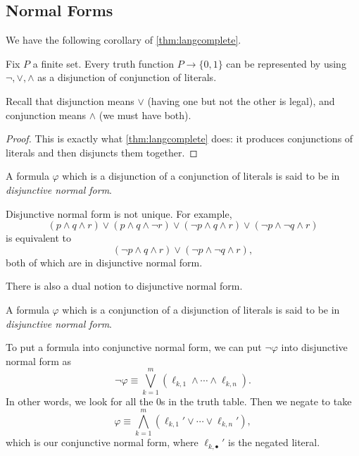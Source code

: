 \subsection{Normal Forms}
We have the following corollary of \autoref{thm:langcomplete}.
\begin{corollary} \label{cor:dnf}
	Fix $P$ a finite set. Every truth function $P\to\{0,1\}$ can be represented by using $\lnot,\lor,\land$ as a disjunction of conjunction of literals.
\end{corollary}
Recall that disjunction means $\lor$ (having one but not the other is legal), and conjunction means $\land$ (we must have both).
\begin{proof}
	This is exactly what \autoref{thm:langcomplete} does: it produces conjunctions of literals and then disjuncts them together.
\end{proof}
\begin{definition}
	A formula $\varphi$ which is a disjunction of a conjunction of literals is said to be in \textit{disjunctive normal form}.
\end{definition}
\begin{example}
	Disjunctive normal form is not unique. For example,
	\[(p\land q\land r)\lor(p\land q\land\lnot r)\lor(\lnot p\land q\land r)\lor(\lnot p\land\lnot q\land r)\]
	is equivalent to
	\[(\lnot p\land q\land r)\lor(\lnot p\land\lnot q\land r),\]
	both of which are in disjunctive normal form.
\end{example}
There is also a dual notion to disjunctive normal form.
\begin{definition}
	A formula $\varphi$ which is a conjunction of a disjunction of literals is said to be in \textit{disjunctive normal form}.
\end{definition}
To put a formula into conjunctive normal form, we can put $\lnot\varphi$ into disjunctive normal form as
\[\lnot\varphi\equiv\bigvee_{k=1}^m(\ell_{k,1}\land\cdots\land\ell_{k,n}).\]
In other words, we look for all the $0$s in the truth table. Then we negate to take
\[\varphi\equiv\bigwedge_{k=1}^m(\ell_{k,1}'\lor\cdots\lor\ell_{k,n}'),\]
which is our conjunctive normal form, where $\ell_{k,\bullet}'$ is the negated literal.
